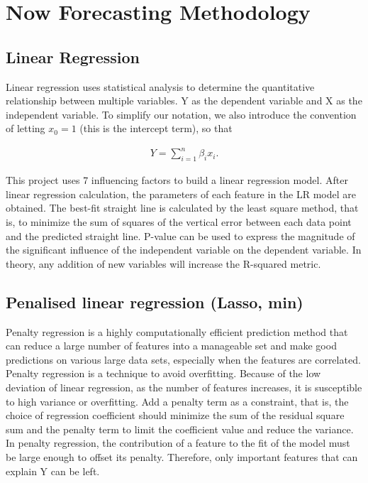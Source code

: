 \section{Now Forecasting Methodology} %

\subsection{Linear Regression}
Linear regression uses statistical analysis to determine the quantitative relationship between multiple variables. Y as the dependent variable and X as the independent variable. To simplify our notation, we also introduce the convention of letting $x_0 = 1$ (this is the intercept term), so that

\begin{eqnarray}
    Y = \sum_{i=1}^{n}{\beta_i x_i}.
\end{eqnarray}


This project uses 7 influencing factors to build a linear regression model. After linear regression calculation, the parameters of each feature in the LR model are obtained. The best-fit straight line is calculated by the least square method, that is, to minimize the sum of squares of the vertical error between each data point and the predicted straight line. P-value can be used to express the magnitude of the significant influence of the independent variable on the dependent variable. In theory, any addition of new variables will increase the R-squared metric.

\subsection{Penalised linear regression (Lasso, min)}
Penalty regression is a highly computationally efficient prediction method that can reduce a large number of features into a manageable set and make good predictions on various large data sets, especially when the features are correlated. Penalty regression is a technique to avoid overfitting. Because of the low deviation of linear regression, as the number of features increases, it is susceptible to high variance or overfitting. Add a penalty term as a constraint, that is, the choice of regression coefficient should minimize the sum of the residual square sum and the penalty term to limit the coefficient value and reduce the variance. In penalty regression, the contribution of a feature to the fit of the model must be large enough to offset its penalty. Therefore, only important features that can explain Y can be left.



